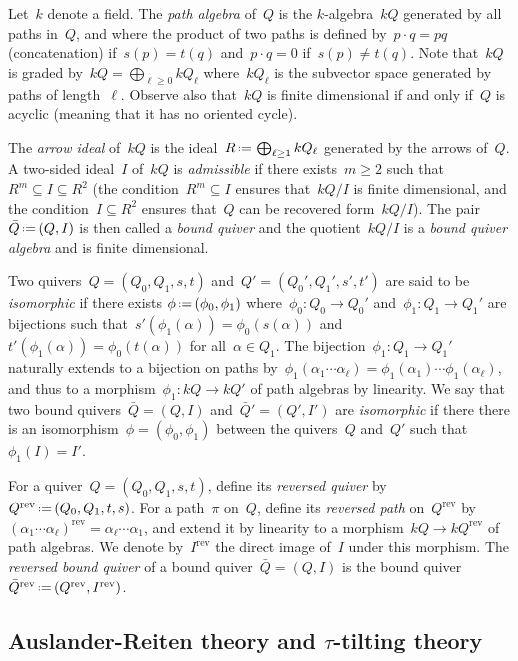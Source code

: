 \documentclass{amsart}
\theoremstyle{definition}
\newcommand{\eqdef}{\mbox{\,\raisebox{0.2ex}{\scriptsize\ensuremath{\mathrm:}}\ensuremath{=}\,}} %
\newcommand{\darkblue}{\color{darkblue}} %
\newcommand{\defn}[1]{\textsl{\darkblue #1}} %
\newcommand{\reversed}[1]{#1^{\mathrm{rev}}} %
\begin{document}
Let~$k$ denote a field.
The \defn{path algebra} of~$Q$ is the $k$-algebra~$kQ$ generated by all paths in~$Q$, and where the product of two paths is defined by~$p \cdot q = pq$ (concatenation) if~$s(p) = t(q)$ and~$p \cdot q = 0$ if~$s(p) \ne t(q)$.
Note that~$kQ$ is graded by~$kQ = \bigoplus_{\ell \ge 0} kQ_\ell$ where~$kQ_\ell$ is the subvector space generated by paths of length~$\ell$.
Observe also that~$kQ$ is finite dimensional if and only if~$Q$ is acyclic (meaning that it has no oriented cycle).

The \defn{arrow ideal} of~$kQ$ is the ideal~$R \eqdef \bigoplus_{\ell \ge 1} kQ_\ell$ generated by the arrows of~$Q$.
A two-sided ideal~$I$ of~$kQ$ is \defn{admissible} if there exists~$m \ge 2$ such that~$R^m \subseteq I \subseteq R^2$ (the condition~$R^m \subseteq I$ ensures that~$kQ/I$ is finite dimensional, and the condition~$I \subseteq R^2$ ensures that~$Q$ can be recovered form~$kQ/I$).
The pair~$\bar Q \eqdef (Q,I)$ is then called a \defn{bound quiver} and the quotient~$kQ/I$ is a \defn{bound quiver algebra} and is finite dimensional.

Two quivers~$Q = (Q_0, Q_1, s, t)$ and~$Q' = (Q_0', Q_1', s', t')$ are said to be \defn{isomorphic} if there exists $\phi \eqdef (\phi_0, \phi_1)$ where~$\phi_0 : Q_0 \to Q_0'$ and~$\phi_1 : Q_1 \to Q_1'$ are bijections such that~${s'(\phi_1(\alpha)) = \phi_0(s(\alpha))}$ and~${t'(\phi_1(\alpha)) = \phi_0(t(\alpha))}$ for all~$\alpha \in Q_1$.
The bijection~$\phi_1 : Q_1 \to Q_1'$ naturally extends to a bijection on paths by~$\phi_1(\alpha_1 \cdots \alpha_\ell) = \phi_1(\alpha_1) \cdots \phi_1(\alpha_\ell)$, and thus to a morphism~$\phi_1 : kQ \to kQ'$ of path algebras by linearity.
We say that two bound quivers~$\bar Q = (Q,I)$ and~$\bar Q' = (Q',I')$ are \defn{isomorphic} if there there is an isomorphism~$\phi = (\phi_0, \phi_1)$ between the quivers~$Q$ and~$Q'$ such that~$\phi_1(I) = I'$.

For a quiver~$Q = (Q_0, Q_1, s, t)$, define its \defn{reversed quiver} by~$\reversed{Q} \eqdef (Q_0, Q_1, t, s)$.
For a path~$\pi$ on~$Q$, define its \defn{reversed path} on~$\reversed{Q}$ by~$\reversed{(\alpha_1 \cdots \alpha_\ell)} = \alpha_\ell \cdots \alpha_1$, and extend it by linearity to a morphism~$kQ \to k\reversed{Q}$ of path algebras.
We denote by~$\reversed{I}$ the direct image of~$I$ under this morphism.
The \defn{reversed bound quiver} of a bound quiver~$\bar Q = (Q,I)$ is the bound quiver~$\reversed{\bar Q} \eqdef (\reversed{Q},\reversed{I})$.

\subsection{Auslander-Reiten theory and $\tau$-tilting theory}
\label{subsec:tautilting}
\end{document}

